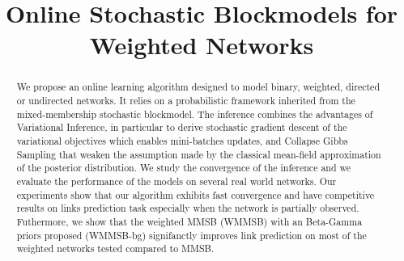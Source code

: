 \documentclass{article}
\begin{document}
\title{Online Stochastic Blockmodels for Weighted Networks}
	
\maketitle

\begin{abstract}
We propose an online learning algorithm designed to model binary, weighted, directed or undirected networks. It relies on a probabilistic framework inherited from the mixed-membership stochastic blockmodel. The inference combines the advantages of Variational Inference, in particular to derive stochastic gradient descent of the variational objectives which enables mini-batches updates, and Collapse Gibbs Sampling that weaken the assumption made by the classical mean-field approximation of the posterior distribution. We study the convergence of the inference and we evaluate the performance of the models on several real world networks. Our experiments show that our algorithm exhibits fast convergence and have competitive  results on links prediction task especially when the network is partially observed. Futhermore, we show that the weighted MMSB (WMMSB) with an Beta-Gamma priors proposed (WMMSB-bg) signifanctly improves link prediction on most of the weighted networks tested compared to MMSB.
\end{abstract}








\clearpage

%



\clearpage
\appendix

\end{document}
